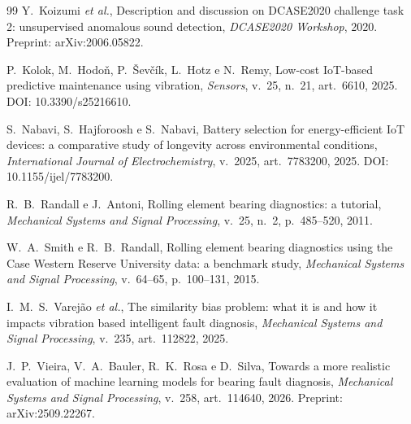 \documentclass[11pt,a4paper]{article}
\begin{document}
\begin{thebibliography}{99}
Y.~Koizumi \emph{et al.},
\newblock Description and discussion on DCASE2020 challenge task 2: unsupervised anomalous sound detection,
\newblock \emph{DCASE2020 Workshop}, 2020.
\newblock Preprint: arXiv:2006.05822.

P.~Kolok, M.~Hodoň, P.~Ševčík, L.~Hotz e N.~Remy,
\newblock Low-cost IoT-based predictive maintenance using vibration,
\newblock \emph{Sensors}, v.~25, n.~21, art.~6610, 2025.
\newblock DOI: 10.3390/s25216610.

S.~Nabavi, S.~Hajforoosh e S.~Nabavi,
\newblock Battery selection for energy-efficient IoT devices: a comparative study of longevity across environmental conditions,
\newblock \emph{International Journal of Electrochemistry}, v.~2025, art.~7783200, 2025.
\newblock DOI: 10.1155/ijel/7783200.

R.~B.~Randall e J.~Antoni,
\newblock Rolling element bearing diagnostics: a tutorial,
\newblock \emph{Mechanical Systems and Signal Processing}, v.~25, n.~2, p.~485--520, 2011.

W.~A.~Smith e R.~B.~Randall,
\newblock Rolling element bearing diagnostics using the Case Western Reserve University data: a benchmark study,
\newblock \emph{Mechanical Systems and Signal Processing}, v.~64--65, p.~100--131, 2015.

I.~M.~S.~Varejão \emph{et al.},
\newblock The similarity bias problem: what it is and how it impacts vibration based intelligent fault diagnosis,
\newblock \emph{Mechanical Systems and Signal Processing}, v.~235, art.~112822, 2025.

J.~P.~Vieira, V.~A.~Bauler, R.~K.~Rosa e D.~Silva,
\newblock Towards a more realistic evaluation of machine learning models for bearing fault diagnosis,
\newblock \emph{Mechanical Systems and Signal Processing}, v.~258, art.~114640, 2026.
\newblock Preprint: arXiv:2509.22267.

\end{thebibliography}
\end{document}
